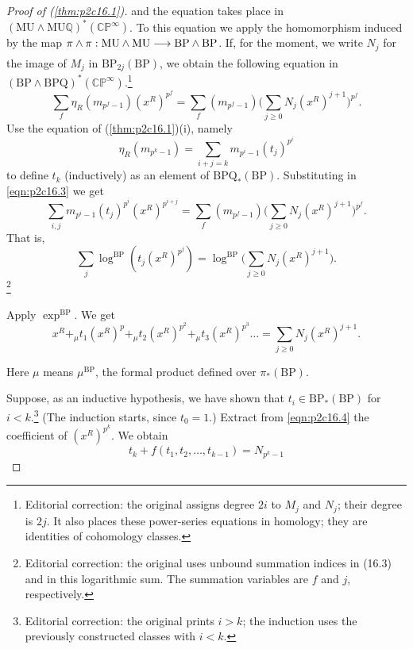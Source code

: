 \documentclass[../main]{subfiles}
\begin{document}
\begin{proof}[Proof of (\ref{thm:p2c16.1})]
and the equation takes place in $(\mathrm {MU} \wedge \mathrm {MU} \mathbb Q)^\ast(\mathbb {CP}^\infty)$. To this equation we apply the homomorphism induced by the map $\pi \wedge \pi : \mathrm {MU} \wedge \mathrm{MU} \lar{} \mathrm{BP} \wedge \mathrm{BP}$. If, for the moment, we write $N_j$ for the image of $M_j$ in $\mathrm {BP}_{2j} (\mathrm {BP})$, we obtain the following equation in $(\mathrm {BP} \wedge \mathrm {BPQ})^\ast (\mathbb {CP}^\infty)$.\footnote{Editorial correction: the original assigns degree $2i$ to $M_j$ and $N_j$; their degree is $2j$. It also places these power-series equations in homology; they are identities of cohomology classes.}
\begin{equation}
\tag{16.3}
\label{eqn:p2c16.3}
\sum_f \eta_R (m_{p^f - 1}) (x^R)^{p^f} = \sum_f (m_{p^f - 1}) \Big(\sum_{j \ge 0} N_j (x^R)^{j + 1}\Big)^{p^f}.
\end{equation}
Use the equation of (\ref{thm:p2c16.1})(i), namely \[\eta_R(m_{p^k - 1}) = \sum_{i + j = k} m_{p^i - 1} (t_j)^{p^i}\] to define $t_k$ (inductively) as an element of $\mathrm {BPQ}_*(\mathrm {BP})$. Substituting in \eqref{eqn:p2c16.3} we get \[\sum_{i, j} m_{p^i - 1} (t_j)^{p^i} (x^R)^{p^{i + j}} = \sum_f (m_{p^f - 1}) \Big(\sum_{j \ge 0} N_j (x^R)^{j + 1}\Big)^{p^f}.\]
That is, \[\sum_j \log^{\mathrm{BP}} (t_j (x^R)^{p^j}) = \log^{\mathrm{BP}} \Big(\sum_{j \ge 0} N_j (x^R)^{j + 1}\Big).\]
\footnote{Editorial correction: the original uses unbound summation indices in (16.3) and in this logarithmic sum. The summation variables are $f$ and $j$, respectively.}

Apply $\exp^{\mathrm{BP}}$. We get 
\begin{equation}
\tag{16.4}
\label{eqn:p2c16.4}
x^R +_\mu t_1 (x^R)^p +_\mu t_2 (x^R)^{p^2} +_\mu t_3 (x^R)^{p^3} \ldots = \sum_{j \ge 0} N_j (x^R)^{j + 1}.
\end{equation}

Here $\mu$ means $\mu^{\mathrm{BP}}$, the formal product defined over $\pi_*(\mathrm{BP})$.

Suppose, as an inductive hypothesis, we have shown that $t_i \in \mathrm{BP}_*(\mathrm{BP})$ for $i < k$.\footnote{Editorial correction: the original prints $i>k$; the induction uses the previously constructed classes with $i<k$.} (The induction starts, since $t_0 = 1$.) Extract from \eqref{eqn:p2c16.4} the coefficient of $(x^R)^{p^k}$. We obtain
\begin{equation}
\tag{16.5}
\label{eqn:p2c16.5}
t_k + f(t_1, t_2, \ldots, t_{k - 1}) = N_{p^k - 1}
\end{equation}


\end{proof}
\end{document}
